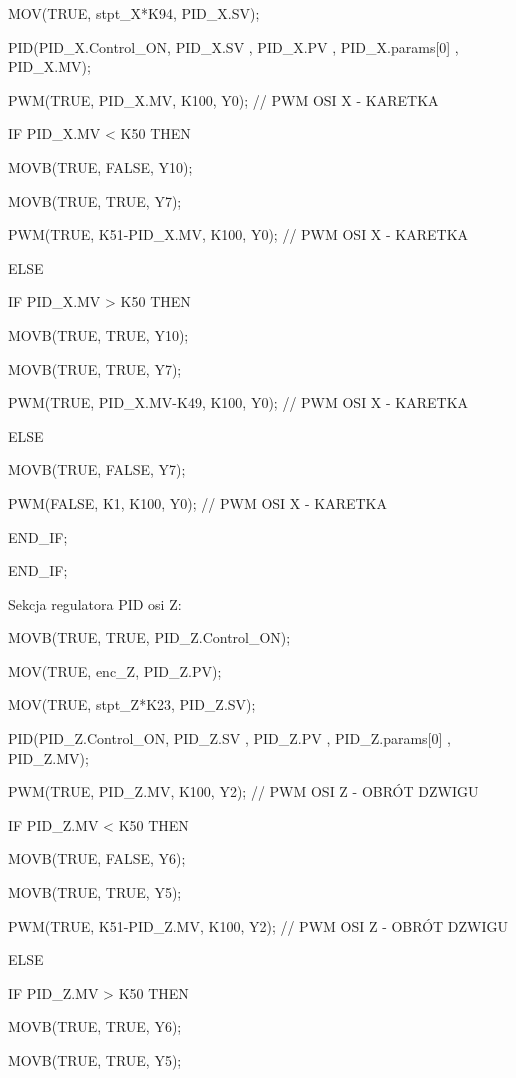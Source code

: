 \documentclass{mwrep}
\begin{document}
\quad MOV(TRUE, stpt\_X*K94, PID\_X.SV);

\quad PID(PID\_X.Control\_ON, PID\_X.SV , PID\_X.PV , PID\_X.params[0] , PID\_X.MV); 

\quad PWM(TRUE, PID\_X.MV, K100, Y0); // PWM OSI X - KARETKA				
	
\quad IF PID\_X.MV < K50 THEN

\quad \quad MOVB(TRUE, FALSE, Y10);

\quad \quad MOVB(TRUE, TRUE, Y7);

\quad \quad PWM(TRUE, K51-PID\_X.MV, K100, Y0); // PWM OSI X - KARETKA		
	
\quad ELSE 

\quad \quad IF PID\_X.MV > K50 THEN

\quad \quad \quad MOVB(TRUE, TRUE, Y10);

\quad \quad \quad MOVB(TRUE, TRUE, Y7);

\quad \quad \quad PWM(TRUE, PID\_X.MV-K49, K100, Y0); // PWM OSI X - KARETKA	
	
\quad \quad \quad ELSE	

\quad \quad \quad MOVB(TRUE, FALSE, Y7);

\quad \quad \quad PWM(FALSE, K1, K100, Y0); // PWM OSI X - KARETKA	

\quad \quad END\_IF;

\quad END\_IF;

Sekcja regulatora PID osi Z:

\quad MOVB(TRUE, TRUE, PID\_Z.Control\_ON);

\quad MOV(TRUE, enc\_Z, PID\_Z.PV);

\quad MOV(TRUE, stpt\_Z*K23, PID\_Z.SV);

\quad PID(PID\_Z.Control\_ON, PID\_Z.SV , PID\_Z.PV , PID\_Z.params[0] , PID\_Z.MV); 

\quad PWM(TRUE, PID\_Z.MV, K100, Y2); // PWM OSI Z - OBRÓT DZWIGU				
	
\quad IF PID\_Z.MV < K50 THEN

\quad \quad MOVB(TRUE, FALSE, Y6);

\quad \quad MOVB(TRUE, TRUE, Y5);

\quad \quad PWM(TRUE, K51-PID\_Z.MV, K100, Y2); // PWM OSI Z - OBRÓT DZWIGU			

\quad \quad ELSE 

\quad \quad IF PID\_Z.MV > K50 THEN

\quad \quad \quad MOVB(TRUE, TRUE, Y6);

\quad \quad \quad MOVB(TRUE, TRUE, Y5);
\end{document}
